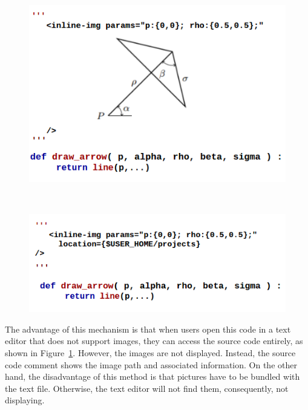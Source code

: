 \begin{figure}[h]
\centering
\begin{minipage}[b]{0.49\textwidth}
  \centering
  \includegraphics[width=1\linewidth]{images/inline-img1}
  \label{fig:inline-img1}
\end{minipage}%
~
~
\begin{minipage}[b]{0.49\textwidth}
  \centering
  \includegraphics[width=1\linewidth]{images/inline-img2}
  \label{fig:inline-img2}
\end{minipage}
\end{figure}

The advantage of this mechanism is that when users open this code in a text editor that does not support images, they can access the source code entirely, as shown in Figure~\ref{fig:inline-img2}. However, the images are not displayed. Instead, the source code comment shows the image path and associated information.  On the other hand, the disadvantage of this method is that pictures have to be bundled with the text file. Otherwise, the text editor will not find them, consequently, not displaying.

